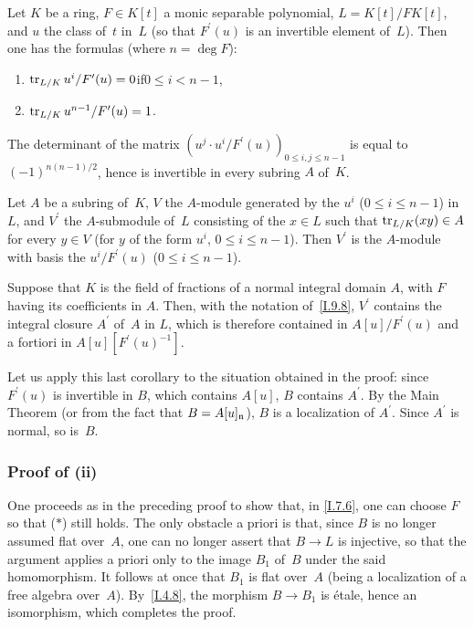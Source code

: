 \begin{lemma}
\label{I.9.6}
Let $K$ be a ring, $F\in K[t]$ a monic separable polynomial,
$L=K[t]/FK[t]$, and $u$ the class of~$t$ in~$L$ (so that
$F^\prime(u)$ is an invertible element of~$L$). Then one
has the formulas (where $n=\deg{F}$):
\begin{enumerate}
\item[] $\operatorname{tr}_{L/K}u^i/F^\prime(u)=0$\quad if\quad $0\le i<n-1$,
\item[] $\operatorname{tr}_{L/K}u^{n-1}/F^\prime(u)=1$.
\end{enumerate}
\end{lemma}

\begin{corollary}
\label{I.9.7}
The determinant of the matrix
$(u^j\cdot u^i/F^\prime(u))_{0\le i,j\le n-1}$ is equal
to $(-1)^{n(n-1)/2}$, hence is invertible in every subring
$A$ of~$K$.
\end{corollary}

\begin{corollary}
\label{I.9.8}
Let $A$ be a subring of~$K$, $V$ the $A$-module generated
by the $u^i$ ($0\le i\le n-1$) in $L$, and $V^\prime$
the $A$-submodule of~$L$ consisting of the $x\in L$ such
that $\operatorname{tr}_{L/K}(xy)\in A$ for every $y\in V$ (\ie for
$y$ of the form $u^i$, $0\le i\le n-1$). Then $V^\prime$
is the $A$-module with basis the $u^i/F^\prime(u)$
($0\le i\le n-1$).
\end{corollary}

\begin{corollary}
\label{I.9.9}
Suppose that $K$ is the field of fractions of a normal
integral domain $A$, with $F$ having its coefficients
in $A$. Then, with the notation of~\ref{I.9.8}, $V^\prime$
contains the integral closure $A^\prime$ of~$A$ in $L$,
which is therefore contained in $A[u]/F^\prime(u)$ and
a fortiori in $A[u][F^\prime(u)^{-1}]$.
\end{corollary}

Let us apply this last corollary to the situation obtained
in the proof: since $F^\prime(u)$ is invertible in $B$,
which contains $A[u]$, $B$ contains $A^\prime$. By the
Main Theorem (or from the fact that $B=A[u]_{\mathfrak{n}}$),
$B$ is a localization of $A^\prime$. Since $A^\prime$ is
normal, so is~$B$.

\subsubsection*{Proof of \textup{(ii)}}
One
proceeds as in the preceding proof to show that, in
\ref{I.7.6}, one can choose $F$ so that ($*$) still holds.
The only obstacle a priori is that, since $B$ is no longer
assumed flat over~$A$, one can no longer assert that
$B\to L$ is injective, so that the argument applies a
priori only to the image $B_1$ of~$B$ under the said
homomorphism. It follows at once that $B_1$ is flat
over~$A$ (being a localization of a free algebra over~$A$).
By~\ref{I.4.8}, the morphism $B\to B_1$ is \'etale,
hence an isomorphism, which completes the proof.

